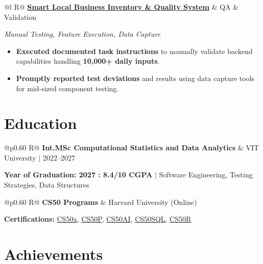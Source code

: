 \documentclass[a4paper,11pt]{article}
\newcommand{\subheading}[1]{\textbf{#1}}
\newcommand{\meta}[1]{{\fontsize{10}{12}\selectfont\textcolor[HTML]{3A3A3A}{#1}}}
\newcommand{\techstack}[1]{{\fontsize{10}{12}\selectfont\textcolor[HTML]{1A1A1A}{\textit{#1}}}}
\newcommand{\ulink}[2]{\href{#1}{#2}}
\begin{document}
\begin{tabularx}{\linewidth}{@{}l R@{}}
\subheading{\ulink{https://github.com/su-jin1425/Smart-Local-Business-Inventory-Billing-System}{Smart Local Business Inventory \& Quality System}} & \meta{QA \& Validation}
\end{tabularx}
\techstack{Manual Testing, Feature Execution, Data Capture}
\begin{itemize}[nosep, leftmargin=1.5em, itemsep=2pt, topsep=2pt]
  \item {\color[HTML]{0A0A0A}\fontsize{11}{14}\selectfont \textbf{Executed documented task instructions} to manually validate backend capabilities handling \textbf{10,000+ daily inputs}.}
  \item {\color[HTML]{0A0A0A}\fontsize{11}{14}\selectfont \textbf{Promptly reported test deviations} and results using data capture tools for mid-sized component testing.}
\end{itemize}

\section{Education}
\vspace{2pt}

\begin{tabularx}{\linewidth}{@{}p{0.60\linewidth} R@{}}
\subheading{Int.MSc Computational Statistics and Data Analytics} & \meta{VIT University $|$ 2022--2027}
\end{tabularx}
{\color[HTML]{3A3A3A}\fontsize{11}{14}\selectfont \textbf{Year of Graduation: 2027 : 8.4/10 CGPA} $|$ Software Engineering, Testing Strategies, Data Structures}

\begin{tabularx}{\linewidth}{@{}p{0.60\linewidth} R@{}}
\subheading{CS50 Programs} & \meta{Harvard University (Online)}
\end{tabularx}
{\color[HTML]{3A3A3A}\fontsize{11}{14}\selectfont \textbf{Certifications:} \ulink{https://cs50.harvard.edu/certificates/b14b78df-e05c-413e-a607-1dd27303053a}{CS50x}, \ulink{https://cs50.harvard.edu/certificates/32477052-9db4-49c4-a5a4-d7e58429ca2c}{CS50P}, \ulink{https://cs50.harvard.edu/certificates/9cdb4d4a-1250-4f8e-9fd7-191864e0f919}{CS50AI}, \ulink{https://cs50.harvard.edu/certificates/bc486f24-f085-4e61-8536-80940b97a1b9}{CS50SQL}, \ulink{https://cs50.harvard.edu/certificates/666838e6-a053-4d82-b179-a60fe745fd84}{CS50R}}

\section{Achievements}
\vspace{2pt}
\end{document}
